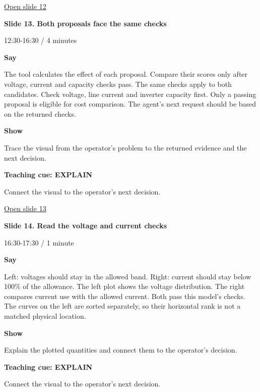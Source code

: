 \documentclass[12pt,letterpaper]{article}
\begin{document}
\vfill\href{https://alaaselim-sudo.github.io/GridGuard-Agentic-AI-Tutorials/operator-cases/#/12}{Open slide 12}\par
\clearpage{}
{\Large\bfseries\color{IEEEBlue} Slide 13. Both proposals face the same checks\par}\medskip
{\small\color{Slate} 12:30-16:30 /\allowbreak{} 4 minutes\par}\medskip
\textbf{Say}\par The tool calculates the effect of each proposal. Compare their scores only after voltage, current and capacity checks pass. The same checks apply to both candidates. Check voltage, line current and inverter capacity first. Only a passing proposal is eligible for cost comparison. The agent's next request should be based on the returned checks.\par\medskip
\textbf{Show}\par Trace the visual from the operator's problem to the returned evidence and the next decision.\par\medskip
\textbf{Teaching cue: EXPLAIN}\par Connect the visual to the operator's next decision.\par\medskip
\vfill\href{https://alaaselim-sudo.github.io/GridGuard-Agentic-AI-Tutorials/operator-cases/#/13}{Open slide 13}\par
\clearpage{}
{\Large\bfseries\color{IEEEBlue} Slide 14. Read the voltage and current checks\par}\medskip
{\small\color{Slate} 16:30-17:30 /\allowbreak{} 1 minute\par}\medskip
\textbf{Say}\par Left: voltages should stay in the allowed band. Right: current should stay below 100\% of the allowance. The left plot shows the voltage distribution. The right compares current use with the allowed current. Both pass this model's checks. The curves on the left are sorted separately, so their horizontal rank is not a matched physical location.\par\medskip
\textbf{Show}\par Explain the plotted quantities and connect them to the operator's decision.\par\medskip
\textbf{Teaching cue: EXPLAIN}\par Connect the visual to the operator's next decision.\par\medskip
\end{document}
